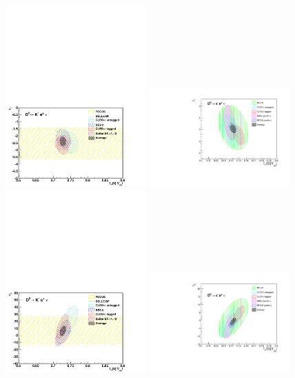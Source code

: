\begin{figure}[p]
\begin{center}
\includegraphics[bb= 0 0 521 356, width=0.48\textwidth]{figures/charm/Kenu_f0r1_ellipses.pdf}\hfill
\includegraphics[width=0.48\textwidth]{figures/charm/sl_new_f0r1_pi.pdf}
\includegraphics[bb= 0 0 521 356, width=0.48\textwidth]{figures/charm/Kenu_f0r2_ellipses.pdf}\hfill
\includegraphics[width=0.48\textwidth]{figures/charm/sl_new_f0r2_pi.pdf}\hfill

\end{center}
\end{figure}

